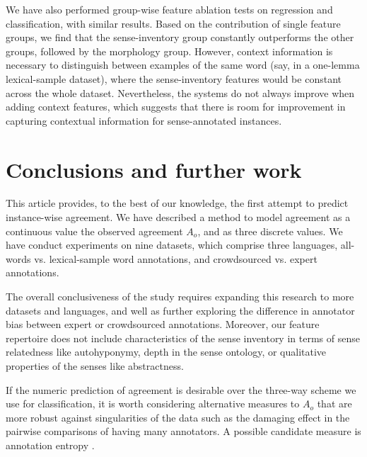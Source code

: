 \documentclass[11pt,a4paper]{article}
\begin{document}
We have also performed group-wise feature ablation tests on regression and classification, with similar results. Based on the contribution of single feature groups, we find that the sense-inventory group constantly outperforms the other groups, followed by the morphology group. 
However, context information is necessary to distinguish between examples of the same word (say, in a one-lemma lexical-sample dataset), where the sense-inventory features would be constant across the whole dataset. Nevertheless, the systems do not always improve when adding context features, which suggests that there is room for improvement in capturing contextual information for sense-annotated instances.
\section{Conclusions and further work}
This article provides, to the best of our knowledge, the first attempt to predict instance-wise agreement.
We have described a method to model agreement as a continuous value  the observed agreement $A_o$, and as three discrete values. We have conduct experiments on nine datasets, which comprise three languages, all-words vs. lexical-sample word annotations, and crowdsourced vs. expert annotations. 


The overall conclusiveness of the study requires expanding this research to more datasets and languages, and well as further exploring the difference in annotator bias between expert or crowdsourced annotations. Moreover, our feature repertoire does not include characteristics of the sense inventory in terms of sense relatedness like autohyponymy, depth in the sense ontology, or qualitative properties of the senses like abstractness.

If the numeric prediction of agreement is desirable over the three-way scheme we use for classification, it is worth considering alternative measures to $A_o$ that are more robust against singularities of the data such as the damaging effect in the pairwise comparisons of having many annotators. A possible candidate measure is annotation entropy \cite{Yarowsky2002}.



\end{document}
